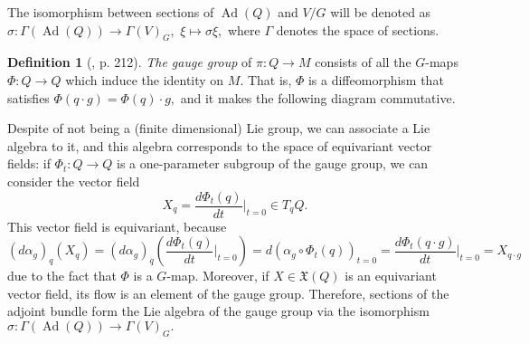 \documentclass[12pt, letterpaper, reqno]{amsart}
\theoremstyle{definition}
\newtheorem{df}{Definition}
\theoremstyle{plain}
\theoremstyle{remark}
\begin{document}
The isomorphism between sections of $ \operatorname{Ad} (Q) $ and $ V/G $ will be denoted as $ \sigma: \Gamma( \operatorname{Ad} (Q)) \rightarrow \Gamma(V)_G, $ $ \xi \mapsto \sigma\xi, $ where $ \Gamma $ denotes the space of sections.

\begin{df}[\cite{montgomery2002tour}, p. 212]
	\textit{The gauge group} of $ \pi: Q \rightarrow M $ consists of all the $ G $-maps $ \Phi: Q \rightarrow  Q$ which induce the identity on $ M. $ That is, $ \Phi $ is a diffeomorphism that satisfies $ \Phi(q\cdot g) =\Phi(q)\cdot g, $ and it makes the following diagram commutative.
	\begin{center}
	\end{center}
\end{df}
Despite of not being a (finite dimensional) Lie group, we can associate a Lie algebra to it, and this algebra corresponds to the space of equivariant vector fields: if $ \Phi_t: Q \rightarrow Q $ is a one-parameter subgroup of the gauge group, we can consider the vector field $$ X_q = \frac{d \Phi_t(q)}{dt} \Big|_{t=0}\in T_qQ. $$ This vector field is equivariant, because $$ (d\alpha_g)_q(X_q)=(d\alpha_g)_q \left( \frac{d \Phi_t(q)}{dt} \Big|_{t=0} \right)= d(\alpha_g \circ \Phi_t(q))_{t=0}= \frac{d\Phi_t(q\cdot g)}{dt} \Big|_{t=0}=X_{q\cdot g}  $$
due to the fact that $ \Phi $ is a $ G $-map. Moreover, if $ X\in \mathfrak{X}(Q) $ is an equivariant vector field, its flow is an element of the gauge group. Therefore, sections of the adjoint bundle form the Lie algebra of the gauge group via the isomorphism $ \sigma: \Gamma( \operatorname{Ad} (Q)) \rightarrow  \Gamma(V)_G. $ 
\end{document}
